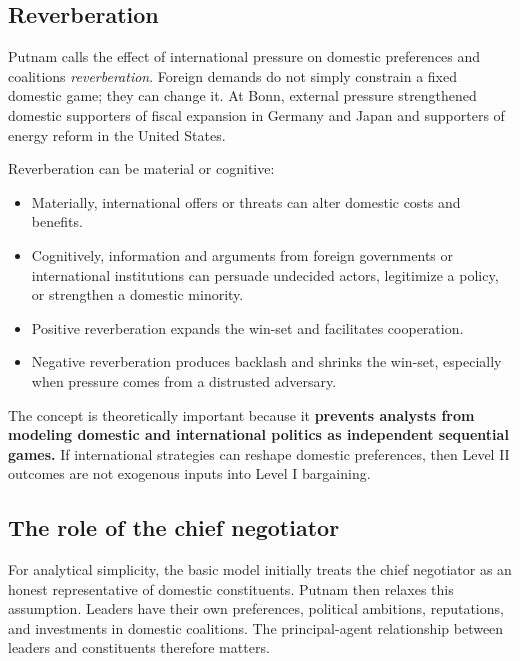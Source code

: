 \subsection{Reverberation}

Putnam calls the effect of international pressure on domestic preferences and coalitions \emph{reverberation}. Foreign demands do not simply constrain a fixed domestic game; they can change it. At Bonn, external pressure strengthened domestic supporters of fiscal expansion in Germany and Japan and supporters of energy reform in the United States.

Reverberation can be material or cognitive:
\begin{itemize}
    \item Materially, international offers or threats can alter domestic costs and benefits.
    \item Cognitively, information and arguments from foreign governments or international institutions can persuade undecided actors, legitimize a policy, or strengthen a domestic minority.
\end{itemize}

\begin{itemize}
    \item Positive reverberation expands the win-set and facilitates cooperation.
    \item Negative reverberation produces backlash and shrinks the win-set, especially when pressure comes from a distrusted adversary.
\end{itemize}

The concept is theoretically important because it \textbf{prevents analysts from modeling domestic and international politics as independent sequential games.} If international strategies can reshape domestic preferences, then Level II outcomes are not exogenous inputs into Level I bargaining.

\subsection{The role of the chief negotiator}

For analytical simplicity, the basic model initially treats the chief negotiator as an honest representative of domestic constituents. Putnam then relaxes this assumption. Leaders have their own preferences, political ambitions, reputations, and investments in domestic coalitions. The principal-agent relationship between leaders and constituents therefore matters.

